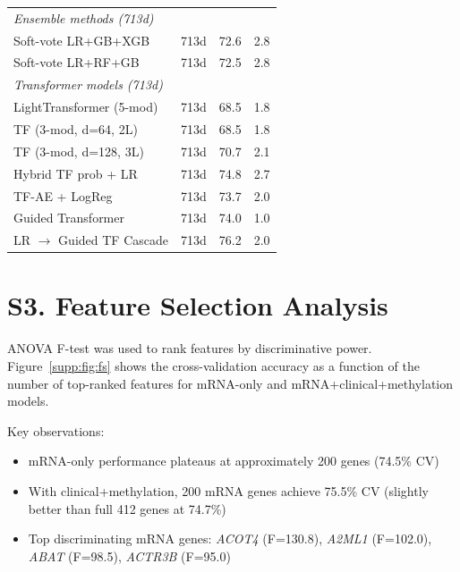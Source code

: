 \documentclass[11pt,a4paper]{article}
\begin{document}
\begin{table}[H]
\begin{tabular}{llcc}
\midrule
\multicolumn{4}{l}{\textit{Ensemble methods (713d)}} \\
Soft-vote LR+GB+XGB & 713d & 72.6 & 2.8 \\
Soft-vote LR+RF+GB & 713d & 72.5 & 2.8 \\
\midrule
\multicolumn{4}{l}{\textit{Transformer models (713d)}} \\
LightTransformer (5-mod) & 713d & 68.5 & 1.8 \\
TF (3-mod, d=64, 2L) & 713d & 68.5 & 1.8 \\
TF (3-mod, d=128, 3L) & 713d & 70.7 & 2.1 \\
Hybrid TF prob + LR & 713d & 74.8 & 2.7 \\
TF-AE + LogReg & 713d & 73.7 & 2.0 \\
Guided Transformer & 713d & 74.0 & 1.0 \\
LR $\rightarrow$ Guided TF Cascade & 713d & 76.2 & 2.0 \\
\bottomrule
\end{tabular}
\end{table}

\section*{S3. Feature Selection Analysis}
\label{supp:fig:feature_selection}

ANOVA F-test was used to rank features by discriminative power. Figure~\ref{supp:fig:fs} shows the cross-validation accuracy as a function of the number of top-ranked features for mRNA-only and mRNA+clinical+methylation models.

Key observations:
\begin{itemize}[nosep]
  \item mRNA-only performance plateaus at approximately 200 genes (74.5\% CV)
  \item With clinical+methylation, 200 mRNA genes achieve 75.5\% CV (slightly better than full 412 genes at 74.7\%)
  \item Top discriminating mRNA genes: \textit{ACOT4} (F=130.8), \textit{A2ML1} (F=102.0), \textit{ABAT} (F=98.5), \textit{ACTR3B} (F=95.0)
\end{itemize}
\end{document}
